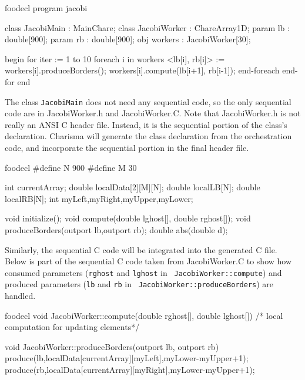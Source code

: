 \documentclass[10pt]{article}
\def\smallfbox#1{\small \fbox{#1}}
\begin{document}
\begin{SaveVerbatim}{foodecl}
program jacobi

class  JacobiMain : MainChare;
class  JacobiWorker : ChareArray1D;
param  lb : double[900];
param  rb : double[900];
obj  workers :  JacobiWorker[30];

begin
    for iter := 1 to 10
	foreach i in workers
	    <lb[i], rb[i]> := workers[i].produceBorders();
	    workers[i].compute(lb[i+1], rb[i-1]);
	end-foreach
    end-for
end
\end{SaveVerbatim}
\vspace{0.1in}
\smallfbox{\BUseVerbatim{foodecl}}
\vspace{0.1in}

The class {\tt JacobiMain} does not need any sequential code, so the only
sequential code are in JacobiWorker.h and JacobiWorker.C. Note that
JacobiWorker.h is not really an ANSI C header file. Instead, it is the
sequential portion of the class's declaration. Charisma will generate the class
declaration from the orchestration code, and incorporate the sequential portion
in the final header file. 

\begin{SaveVerbatim}{foodecl}
#define N 900
#define M 30

int currentArray;	
double localData[2][M][N]; 
double localLB[N];
double localRB[N];
int myLeft,myRight,myUpper,myLower;

void initialize();
void compute(double lghost[], double rghost[]);
void produceBorders(outport lb,outport rb);
double abs(double d);
\end{SaveVerbatim}
\vspace{0.1in}
\smallfbox{\BUseVerbatim{foodecl}}
\vspace{0.1in}

Similarly, the sequential C code will be integrated into the generated C file.
Below is part of the sequential C code taken from JacobiWorker.C to show how
consumed parameters ({\tt rghost} and {\tt lghost} in {\tt
JacobiWorker::compute}) and produced parameters ({\tt lb} and {\tt rb} in {\tt
JacobiWorker::produceBorders}) are handled.

\begin{SaveVerbatim}{foodecl}
void JacobiWorker::compute(double rghost[], double lghost[]){
    /* local computation for updating elements*/
}

void JacobiWorker::produceBorders(outport lb, outport rb){
    produce(lb,localData[currentArray][myLeft],myLower-myUpper+1);
    produce(rb,localData[currentArray][myRight],myLower-myUpper+1);
}
\end{SaveVerbatim}
\vspace{0.1in}
\smallfbox{\BUseVerbatim{foodecl}}
\vspace{0.1in}
\end{document}
